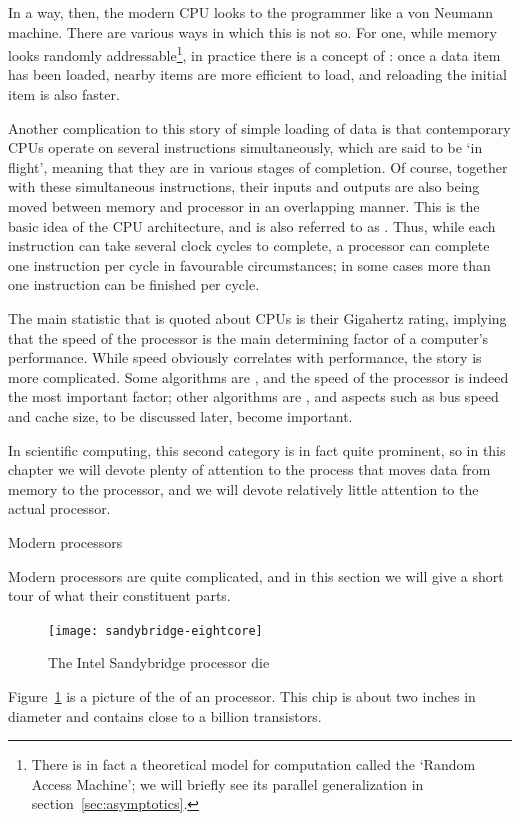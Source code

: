 In a way, then, the modern CPU looks to the programmer like a von
Neumann machine. There are various ways in which this is not so. For
one, while memory looks randomly addressable\footnote{There is in fact
  a theoretical model for computation called the `Random Access
  Machine'; we will briefly see its parallel generalization in
  section~\ref{sec:asymptotics}.}, in practice there is a concept of
: once a data item has been loaded, nearby items
are more efficient to load, and reloading the initial item is also faster.

Another complication to this story of simple loading of data is that
contemporary CPUs operate on several
instructions simultaneously, which are said to be `in flight', meaning
that they are in various stages of completion. 
Of course, together with these simultaneous instructions, their inputs
and outputs are also being moved between memory and processor in an
overlapping manner.
This is the basic idea
of the  CPU architecture, and is also referred
to as . Thus, while each
instruction can take several clock cycles to complete, a processor can
complete one instruction per cycle in favourable circumstances; in
some cases more than one instruction can be finished per cycle.
 
The main statistic that is quoted about CPUs is their 
Gigahertz rating, implying that the speed of the processor is the main
determining factor of a computer's performance. While speed obviously
correlates with performance, the story is more complicated. Some
algorithms are , and the speed of the processor
is indeed the most important factor; other algorithms are
, and aspects such as bus speed and cache
size, to be discussed later,
become important.

In scientific computing, this second category is in fact quite
prominent, so in this chapter we will devote plenty of attention to
the process that moves data from memory to the processor, and we will
devote relatively little attention to the actual processor.

 {Modern processors}
\label{sec:fp}

Modern processors are quite complicated, and in this section we will
give a short tour of what their constituent parts.
\begin{figure}[ht]
  \texttt{[image: sandybridge-eightcore]}
  \caption{The Intel Sandybridge processor die}
  \label{fig:sandybridge}
\end{figure}
Figure~\ref{fig:sandybridge} is a picture of the 
of an  processor.
This chip is about two inches in diameter and contains close
to a billion transistors.

